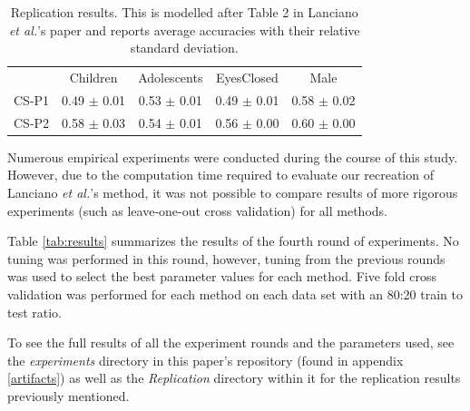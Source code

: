 \documentclass[sigconf]{acmart}
\begin{document}
\begin{table}[t]
    \centering
    \caption{Replication results. This is modelled after Table 2 in Lanciano \emph{et al.}'s paper and reports average accuracies with their relative standard deviation.}
    \begin{tabular}{c c c c c}
        \hline
          & Children & Adolescents & EyesClosed & Male\\
        CS-P1 & 0.49 $\pm$ 0.01 & 0.53 $\pm$ 0.01 & 0.49 $\pm$ 0.01 & 0.58 $\pm$ 0.02\\
        CS-P2 & 0.58 $\pm$ 0.03 & 0.54 $\pm$ 0.01 & 0.56 $\pm$ 0.00 & 0.60 $\pm$ 0.00\\
        \hline
    \end{tabular}
    \label{tab:replication}
\end{table}

Numerous empirical experiments were conducted during the course of this study.
However, due to the computation time required to evaluate our recreation of Lanciano \emph{et al.}'s method, it was not possible to compare results of more rigorous experiments (such as leave-one-out cross validation) for all methods.

Table \ref{tab:results} summarizes the results of the fourth round of experiments.
No tuning was performed in this round, however, tuning from the previous rounds was used to select the best parameter values for each method.
Five fold cross validation was performed for each method on each data set with an 80:20 train to test ratio.

To see the full results of all the experiment rounds and the parameters used, see the \emph{experiments} directory in this paper's repository (found in appendix \ref{artifacts}) as well as the \emph{Replication} directory within it for the replication results previously mentioned.
\end{document}
